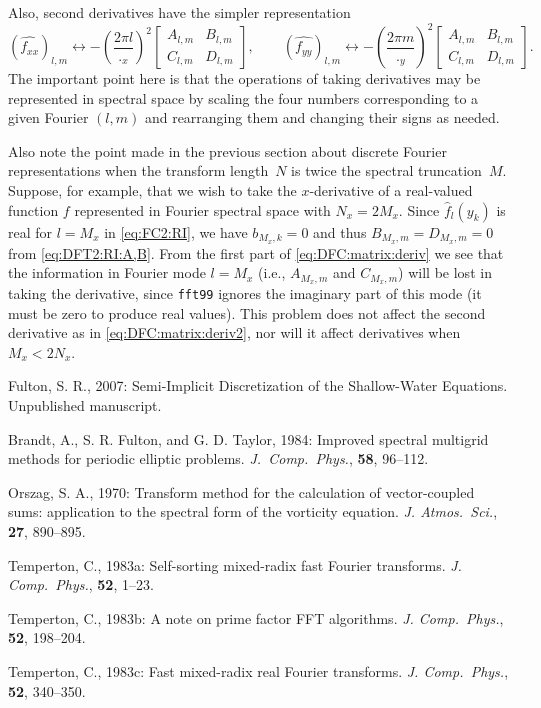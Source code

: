 \documentclass[12pt]{article}
\newcommand{\dfc}[1]{\widehat{#1}}  %
\newcommand{\Fc}[1]{\dfc{#1}}       %
\newcommand{\code}[1]{\texttt{#1}}
\begin{document}
Also, second derivatives have the simpler representation
\begin{equation}
   (\Fc{f_{xx}})_{l,m} \leftrightarrow -\left(\frac{2\pi l}{\period_x}\right)^2
   \begin{bmatrix} A_{l,m} & B_{l,m} \\ C_{l,m} & D_{l,m} \end{bmatrix},
\qquad
   (\Fc{f_{yy}})_{l,m} \leftrightarrow -\left(\frac{2\pi m}{\period_y}\right)^2
   \begin{bmatrix} A_{l,m} & B_{l,m} \\ C_{l,m} & D_{l,m} \end{bmatrix}.
\label{eq:DFC:matrix:deriv2}
\end{equation}
The important point here is that the operations of taking derivatives may be
represented in spectral space by scaling the four numbers corresponding to a
given Fourier $(l,m)$ and rearranging them and changing their signs as needed.  

Also note the point made in the previous section about discrete Fourier
representations when the transform length~$N$ is twice the spectral
truncation~$M$.  Suppose, for example, that we wish to take the $x$-derivative
of a real-valued function $f$ represented in Fourier spectral space with
$N_x=2M_x$.  Since $\Fc{f}_{l}(y_k)$ is real for $l=M_x$ in \eqref{eq:FC2:RI},
we have $b_{M_x,k}=0$ and thus $B_{M_x,m}=D_{M_x,m}=0$ from
\eqref{eq:DFT2:RI:A,B}.  From the first part of \eqref{eq:DFC:matrix:deriv} we
see that the information in Fourier mode $l=M_x$ (i.e., $A_{M_x,m}$ and
$C_{M_x,m}$) will be lost in taking the derivative, since \code{fft99} ignores
the imaginary part of this mode (it must be zero to produce real values).
This problem does not affect the second derivative as in
\eqref{eq:DFC:matrix:deriv2}, nor will it affect derivatives when $M_x<2N_x$.

\pagebreak[3]
\begin{thebibliography}{99}

Fulton, S. R., 2007:
Semi-Implicit Discretization of the Shallow-Water Equations.
Unpublished manuscript.

Brandt, A., S. R. Fulton, and G. D. Taylor, 1984:
Improved spectral multigrid methods for periodic elliptic problems.
\textsl{J.\ Comp.\ Phys.}, \textbf{58}, 96--112.

Orszag, S. A., 1970:
Transform method for the calculation of vector-coupled sums:
application to the spectral form of the vorticity equation.
\textsl{J. Atmos.\ Sci.}, \textbf{27}, 890--895.

Temperton, C., 1983a:  
Self-sorting mixed-radix fast Fourier transforms. 
\textsl{J. Comp.\ Phys.}, \textbf{52}, 1--23.

Temperton, C., 1983b:  
A note on prime factor FFT algorithms.  
\textsl{J. Comp.\ Phys.}, \textbf{52}, 198--204.

Temperton, C., 1983c:  
Fast mixed-radix real Fourier transforms.  
\textsl{J.  Comp.\ Phys.}, \textbf{52}, 340--350.

\end{thebibliography}
\end{document}
